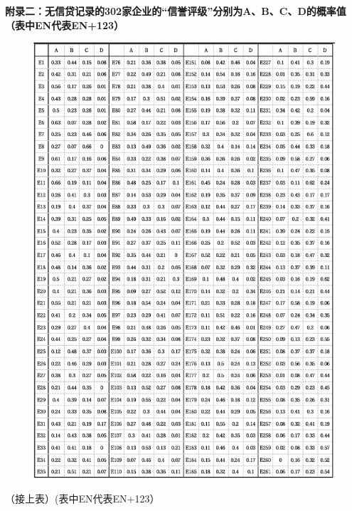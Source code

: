 \documentclass[bwprint]{cumcm}
\begin{document}
\begin{appendices}
\newpage
 \noindent \textbf{附录二：无信贷记录的302家企业的“信誉评级”分别为A、B、C、D的概率值（表中EN代表EN+123）}
 \begin{figure}[h]%
	\centering  %
	\includegraphics[width=0.95\linewidth]{figures/figure6.jpg}  %
	\label{fig:mcmthesis-logo}   %
\end{figure}
\newpage
（接上表）(表中EN代表EN+123）
 \begin{figure}[h]%
	\centering  %

\end{figure}
\end{appendices}
\end{document}
